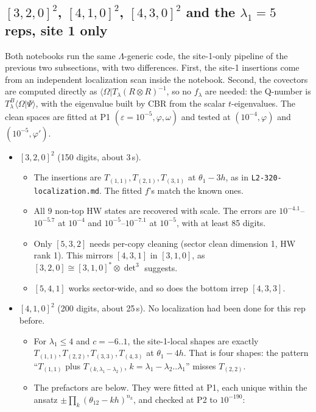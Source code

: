 \documentclass[11pt]{article}
\newcommand{\bra}[1]{\langle #1|}
\newcommand{\Om}{\Omega}
\newcommand{\eps}{\varepsilon}
\newcommand{\tw}{\theta_{12}}
\begin{document}
\subsection{$[3,2,0]^2$, $[4,1,0]^2$, $[4,3,0]^2$ and the $\lambda_1=5$ reps, site 1 only}
Both notebooks run the same $\Lambda$-generic code, the site-1-only pipeline of the previous two subsections, with two differences. First, the site-1 insertions come from an independent localization scan inside the notebook. Second, the covectors are computed directly as $\bra{\Om}T_\lambda(R\otimes R)^{-1}$, so no $f_\lambda$ are needed: the Q-number is $T^B_\lambda\langle\Om|\Psi\rangle$, with the eigenvalue built by CBR from the scalar $t$-eigenvalues. The clean spaces are fitted at P1 $(\eps=10^{-5},\varphi,\omega)$ and tested at $(10^{-4},\varphi)$ and $(10^{-5},\varphi')$.
\begin{itemize}
\item \textbf{$[3,2,0]^2$} (150 digits, about 3\,s).
  \begin{itemize}
  \item The insertions are $T_{(1,1)},T_{(2,1)},T_{(3,1)}$ at $\theta_1-3h$, as in \texttt{L2-320-localization.md}. The fitted $f$'s match the known ones.
  \item All 9 non-top HW states are recovered with scale. The errors are $10^{-4.1}$--$10^{-5.7}$ at $10^{-4}$ and $10^{-5}$--$10^{-7.1}$ at $10^{-5}$, with at least 85 digits.
  \item Only $[5,3,2]$ needs per-copy cleaning (sector clean dimension 1, HW rank 1). This mirrors $[4,3,1]$ in $[3,1,0]$, as $[3,2,0]\cong[3,1,0]^*\otimes\det^3$ suggests.
  \item $[5,4,1]$ works sector-wide, and so does the bottom irrep $[4,3,3]$.
  \end{itemize}
\item \textbf{$[4,1,0]^2$} (200 digits, about 25\,s). No localization had been done for this rep before.
  \begin{itemize}
  \item For $\lambda_1\le4$ and $c=-6..1$, the site-1-local shapes are exactly $T_{(1,1)},T_{(2,2)},T_{(3,3)},T_{(4,3)}$ at $\theta_1-4h$. That is four shapes: the pattern ``$T_{(1,1)}$ plus $T_{(k,\lambda_1-\lambda_2)}$, $k=\lambda_1-\lambda_2..\lambda_1$'' misses $T_{(2,2)}$.
  \item The prefactors are below. They were fitted at P1, each unique within the ansatz $\pm\prod_k(\tw-kh)^{n_k}$, and checked at P2 to $10^{-190}$:
  \begin{align*}

\end{align*}
\end{itemize}
\end{itemize}
\end{document}
